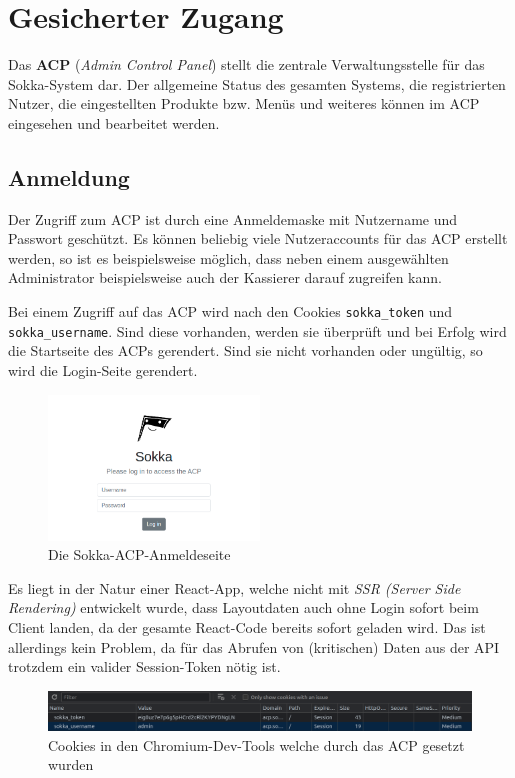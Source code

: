 \chapter{Gesicherter Zugang}

Das \textbf{ACP} (\textit{Admin Control Panel}) stellt die zentrale Verwaltungsstelle für das Sokka-System dar. Der allgemeine Status des gesamten Systems, die registrierten Nutzer, die eingestellten Produkte bzw. Menüs und weiteres können im ACP eingesehen und bearbeitet werden.

\section{Anmeldung}

Der Zugriff zum ACP ist durch eine Anmeldemaske mit Nutzername und Passwort geschützt. Es können beliebig viele Nutzeraccounts für das ACP erstellt werden, so ist es beispielsweise möglich, dass neben einem ausgewählten Administrator beispielsweise auch der Kassierer darauf zugreifen kann.

Bei einem Zugriff auf das ACP wird nach den Cookies \lstinline{sokka_token} und \lstinline{sokka_username}. Sind diese vorhanden, werden sie überprüft und bei Erfolg wird die Startseite des ACPs gerendert. Sind sie nicht vorhanden oder ungültig, so wird die Login-Seite gerendert.

\begin{figure}[ht]
    \centering
    \includegraphics[width=0.5\textwidth]{images/ACP/login.png}
    \caption{Die Sokka-ACP-Anmeldeseite}
\end{figure}

Es liegt in der Natur einer React-App, welche nicht mit \textit{SSR (Server Side Rendering)} entwickelt wurde, dass Layoutdaten auch ohne Login sofort beim Client landen, da der gesamte React-Code bereits sofort geladen wird. Das ist allerdings kein Problem, da für das Abrufen von (kritischen) Daten aus der API trotzdem ein valider Session-Token nötig ist.

\begin{figure}[ht]
    \centering
    \includegraphics[width=1\textwidth]{images/ACP/cookies.png}
    \caption{Cookies in den Chromium-Dev-Tools welche durch das ACP gesetzt wurden}
\end{figure}

